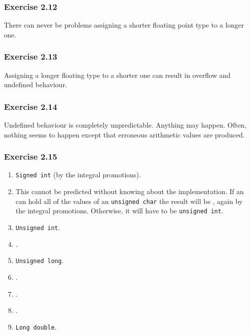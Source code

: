   

  \subsubsection*{Exercise 2.12}

   There can never be problems assigning a shorter floating point type to
    a longer one.


  

  \subsubsection*{Exercise 2.13}

   Assigning a longer floating type to a shorter one can result in overflow
    and undefined behaviour.


  

  \subsubsection*{Exercise 2.14}

   Undefined behaviour is completely unpredictable. Anything may happen.
    Often, nothing seems to happen except that erroneous arithmetic values are
    produced.


  

  \subsubsection*{Exercise 2.15}

   \begin{enumerate}
    \item \texttt{Signed int} (by the integral promotions).

    \item This cannot be predicted without knowing about the implementation.
     If an \kint{} can hold all of the values of an \texttt{unsigned
     char} the result will be \kint, again by the integral
     promotions. Otherwise, it will have to be \texttt{unsigned int}.

    \item \texttt{Unsigned int}.
    \item \klong.
    \item \texttt{Unsigned long}.
    \item \klong.
    \item \float.
    \item \float.
    \item \texttt{Long double}.
   \end{enumerate}

